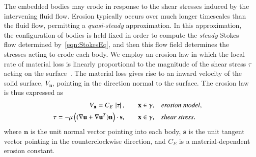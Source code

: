 \documentclass[3p]{elsarticle}
\newcommand{\nn}{{\mathbf{n}}}
\renewcommand{\ss}{{\mathbf{s}}}
\newcommand{\uu}{{\mathbf{u}}}
\newcommand{\UU}{{\mathbf{U}}}
\newcommand{\xx}{{\mathbf{x}}}
\newcommand{\abs}[1]{\left| #1 \right|}
\newcommand{\Vn}{V_\nn}
\newcommand{\CE}{C_E}
\begin{document}
The embedded bodies may erode in response to the shear stresses induced by the intervening fluid flow. Erosion typically occurs over much longer timescales than the fluid flow, permitting a {\em quasi-steady} approximation. In this approximation, the configuration of bodies is held fixed in order to compute the {\em steady} Stokes flow determined by~\eqref{eqn:StokesEq}, and then this flow field determines the stresses acting to erode each body. We employ an erosion law in which the local rate of material loss is linearly proportional to the magnitude of the shear stress $\tau$ acting on the surface~\cite{Ristroph2012, Moore2013, Mitchell2016, MooreCPAM2017, HewettJFS2017, quaife2018boundary, chiu2020viscous}. The material loss gives rise to an inward velocity of the solid surface, $\Vn$, pointing in the direction normal to the surface. The erosion law is thus expressed as
\begin{align}
\Vn = \CE \, \abs{\tau}, 
	&\hspace{20pt} \xx \in \gamma, &&\mbox{\em erosion model}, 
\label{Vn0} \\
\tau = -\mu \left( ( \nabla \uu + \nabla \uu^T) \nn \right) \cdot \ss,
	&\hspace{20pt} \xx \in \gamma, &&\mbox{\em shear stress}.
\label{tau0}
\end{align}
where $\nn$ is the unit normal vector pointing into each body, $\ss$ is the unit tangent vector pointing in the counterclockwise direction, and $\CE$ is a material-dependent erosion constant.




\end{document}
